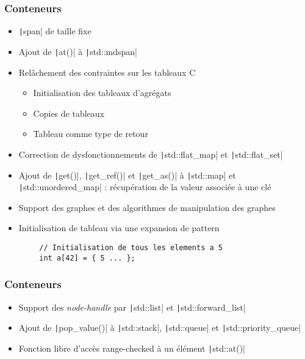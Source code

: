 \documentclass[C++.tex]{subfiles}
\begin{document}
\begin{frame}[fragile]
	\frametitle{Conteneurs}
	\begin{itemize}
		\item \texttt|span| de taille fixe
		\item Ajout de \texttt|at()| à \texttt|std::mdspan|
		\item Relâchement des contraintes sur les tableaux C
		\begin{itemize}
			\item Initialisation des tableaux d'agrégats
			\item Copies de tableaux
			\item Tableau comme type de retour
		\end{itemize}
		\item Correction de dysfonctionnements de \texttt|std::flat_map| et \texttt|std::flat_set|
		\item Ajout de \texttt|get()|, \texttt|get_ref()| et \texttt|get_as()| à \texttt|std::map| et \texttt|std::unordered_map| : récupération de la valeur associée à une clé
		\item Support des graphes et des algorithmes de manipulation des graphes
		\item Initialisation de tableau via une expansion de pattern
	\end{itemize}

	\begin{verbatim}
		// Initialisation de tous les elements a 5
		int a[42] = { 5 ... };
	\end{verbatim}

\end{frame}

\begin{frame}[fragile]
	\frametitle{Conteneurs}
	\begin{itemize}
		\item Support des \textit{node-handle} par \texttt|std::list| et \texttt|std::forward_list|
		\item Ajout de \texttt|pop_value()| à \texttt|std::stack|, \texttt|std::queue| et \texttt|std::priority_queue|
		\item Fonction libre d'accès \og{}range-checked\fg{} à un élément \texttt|std::at()|
	\end{itemize}

\end{frame}
\end{document}
